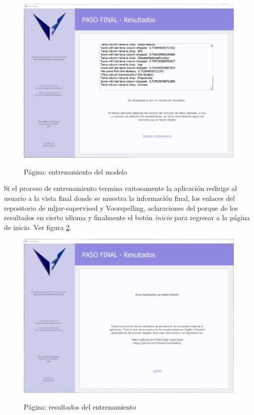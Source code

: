 \begin{figure}[H]
    \centering
    \caption{Página: entrenamiento del modelo}
    \includegraphics[width=\textwidth]{images/training.png}
    \label{fig:training}
\end{figure}

Si el proceso de entrenamiento termina exitosamente la aplicación redirige al usuario a la vista final donde se muestra la información final, los enlaces del repositorio de mljar-supervised y Voorspelling, aclaraciones del porque de los resultados en cierto idioma y finalmente el botón \textit{inicio} para regresar a la página de inicio. Ver figura \ref{fig:trainingrslt}.

\begin{figure}[H]
    \centering
    \caption{Página: resultados del entrenamiento}
    \includegraphics[width=\textwidth]{images/final.png}
    \label{fig:trainingrslt}
\end{figure}

